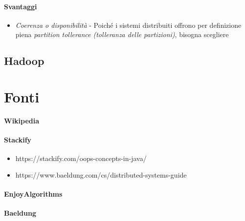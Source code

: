 \documentclass{article}
\begin{document}
        \paragraph{Svantaggi}
            \begin{itemize}
                \item \textit{Coerenza o disponibilità} - Poiché i sistemi distribuiti offrono per definizione piena \textit{partition tollerance (tolleranza delle partizioni)}, bisogna scegliere 
            \end{itemize}
        
    \subsection{Hadoop}

\section{Fonti}
    \paragraph{Wikipedia}
    \paragraph{Stackify}
        \begin{itemize}
            \item https://stackify.com/oops-concepts-in-java/
            \item https://www.baeldung.com/cs/distributed-systems-guide
        \end{itemize} 
    \paragraph{EnjoyAlgorithms}
    \paragraph{Baeldung}
            
            
            
\end{document}

